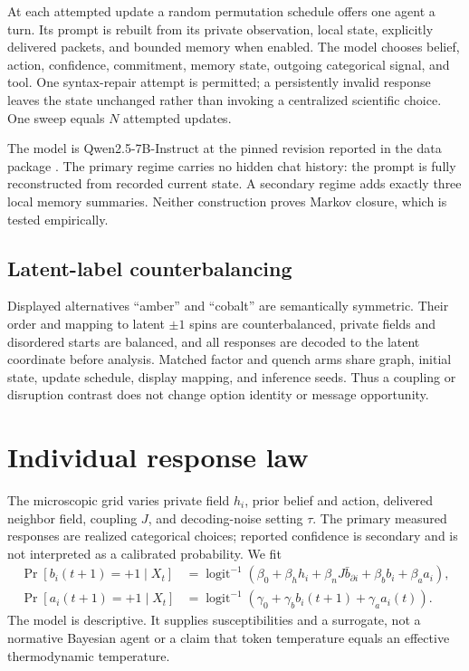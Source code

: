 \documentclass[12pt]{article}
\begin{document}
At each attempted update a random permutation schedule offers one agent a turn.
Its prompt is rebuilt from its private observation, local state, explicitly
delivered packets, and bounded memory when enabled. The model chooses belief,
action, confidence, commitment, memory state, outgoing categorical signal, and
tool. One syntax-repair attempt is permitted; a persistently invalid response
leaves the state unchanged rather than invoking a centralized scientific
choice. One sweep equals $N$ attempted updates.

The model is Qwen2.5-7B-Instruct at the pinned revision reported in the data
package \cite{qwen2024}. The primary regime carries no hidden chat history:
the prompt is fully reconstructed from recorded current state. A secondary
regime adds exactly three local memory summaries. Neither construction proves
Markov closure, which is tested empirically.

\subsection{Latent-label counterbalancing}

Displayed alternatives ``amber'' and ``cobalt'' are semantically symmetric.
Their order and mapping to latent $\pm1$ spins are counterbalanced, private
fields and disordered starts are balanced, and all responses are decoded to the
latent coordinate before analysis. Matched factor and quench arms share graph,
initial state, update schedule, display mapping, and inference seeds. Thus a
coupling or disruption contrast does not change option identity or message
opportunity.

\section{Individual response law}

The microscopic grid varies private field $h_i$, prior belief and action,
delivered neighbor field, coupling $J$, and decoding-noise setting $\tau$. The
primary measured responses are realized categorical choices; reported
confidence is secondary and is not interpreted as a calibrated probability.
We fit
\begin{align}
\Pr[b_i(t+1)=+1\mid X_t]&=\operatorname{logit}^{-1}
(\beta_0+\beta_hh_i+\beta_nJ\bar b_{\partial i}
+\beta_bb_i+\beta_aa_i),\\
\Pr[a_i(t+1)=+1\mid X_t]&=\operatorname{logit}^{-1}
(\gamma_0+\gamma_bb_i(t+1)+\gamma_aa_i(t)).
\end{align}
The model is descriptive. It supplies susceptibilities and a surrogate, not a
normative Bayesian agent or a claim that token temperature equals an effective
thermodynamic temperature.
\end{document}
